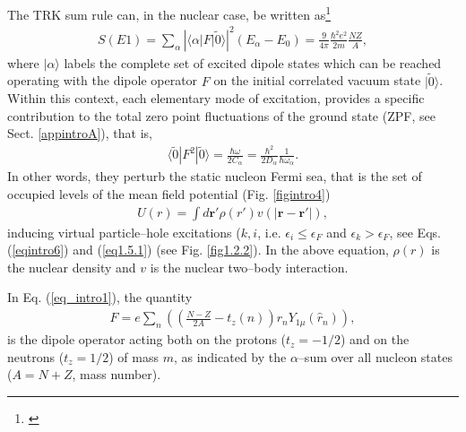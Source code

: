 The TRK sum rule can, in the nuclear case, be written as\footnote{\cite{Bohr:75,Bertsch:05,Bortignon:98}}
\begin{align}\label{eq_intro1}
S(E1)=\sum_\alpha\left|\langle\alpha|F|\tilde 0\rangle\right|^2(E_\alpha-E_0)=\frac{9}{4\pi}\frac{\hbar^2e^2}{2m}\frac{NZ}{A},
\end{align}
where $|\alpha\rangle$ labels the complete set of excited dipole states which can be reached operating with the dipole operator $F$ on the initial correlated vacuum state $|\tilde 0\rangle$. Within this context, each elementary mode of excitation, provides a specific contribution to the total zero point fluctuations of the ground state (ZPF, see Sect. \ref{appintroA}), that is,
\begin{align}\label{eqintro2}
\langle\tilde 0|F^2|\tilde 0\rangle=\frac{\hbar \omega}{2C_\alpha}=\frac{\hbar^2}{2D_\alpha}\frac{1}{\hbar\omega_\alpha}.
\end{align}
In other words, they perturb the static nucleon Fermi sea, that is the set of occupied levels of the mean field potential (Fig. \ref{figintro4})
\begin{align}\label{eqintro3}
U(r)=\int d\mathbf r' \rho(r')v(|\mathbf r-\mathbf r'|),
\end{align}
inducing virtual particle--hole excitations ($k,i$, i.e. $\epsilon_i\leq\epsilon_F$ and $\epsilon_k>\epsilon_F$, see Eqs. (\ref{eqintro6}) and (\ref{eq1.5.1}) (see Fig. \ref{fig1.2.2}). In the above equation, $\rho(r)$ is the nuclear density and $v$ is the nuclear two--body interaction.  


In Eq. (\ref{eq_intro1}), the quantity 
\begin{align}
F=e\sum_n\left(\left(\frac{N-Z}{2A}-t_z(n)\right)r_nY_{1\mu}(\hat r_n)\right),
\end{align}
is the dipole operator acting both on the  protons ($t_z=-1/2$) and on the neutrons ($t_z=1/2$) of mass $m$, as indicated by the $\alpha$--sum over all nucleon states ($A=N+Z$, mass number).

